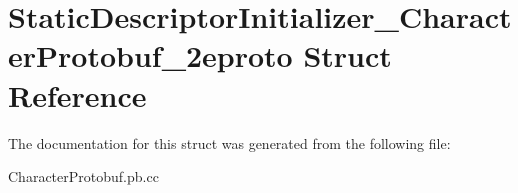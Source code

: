 \hypertarget{structStaticDescriptorInitializer__CharacterProtobuf__2eproto}{}\section{Static\+Descriptor\+Initializer\+\_\+\+Character\+Protobuf\+\_\+2eproto Struct Reference}
\label{structStaticDescriptorInitializer__CharacterProtobuf__2eproto}


The documentation for this struct was generated from the following file\+:\begin{DoxyCompactItemize}
\item 
Character\+Protobuf.\+pb.\+cc\end{DoxyCompactItemize}

